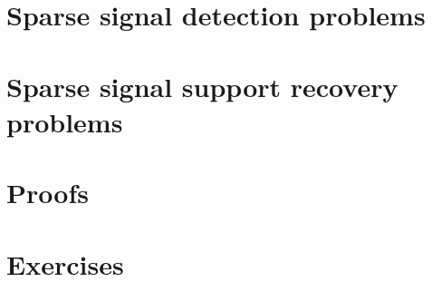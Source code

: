 \section{Sparse signal detection problems}
\label{sec:global-tests}



\section{Sparse signal support recovery problems}
\label{sec:additive-error-model-boundaries}



\section{Proofs}
\label{sec:proofs}



\section{Exercises}
\label{sec:Phase-Transitions:Exercises}





